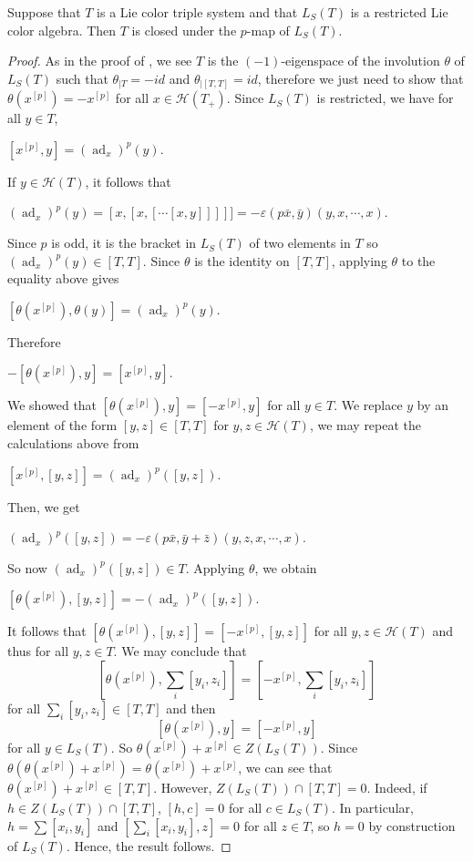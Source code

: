 \documentclass[11pt, twoside]{article}
\DeclareMathOperator{\ad}{ad}
\begin{document}
\begin{thm}\label{thm4.10}
    Suppose that $T$ is a Lie color triple system and that $L_S(T)$ is a restricted Lie color algebra. Then $T$ is closed under the $p$-map of $L_S(T)$.
\end{thm}

\begin{proof}
    As in the proof of \cite[Theorem $3.17 $ ]{H01}, we see $T$ is the $(-1)$-eigenspace of the involution $\theta$ of $L_S(T)$ such that $\theta_{\mid T}=-id $ and $\theta_{\mid [T,T]}=id $, therefore we just need to show that $\theta(x^{[p]})=-x^{[p]} $ for all $x\in \mathcal{H}(T_+)$. Since $L_S(T)$ is restricted, we have for all $y\in T$, \begin{center}
        $[x^{[p]},y]= (\ad_x)^p(y) $.
    \end{center} If $y\in \mathcal{H}(T) $, it follows that \begin{center}
        $(\ad_x)^p(y)= [x,[x,[\cdots[x,y]]]]]= -\varepsilon(p\bar{x},\bar{y})(y,x,\cdots,x) $.
    \end{center} Since $p$ is odd, it is the bracket in $L_S(T)$ of two elements in $T$ so $(\ad_x)^p(y)\in [T,T] $. Since $\theta$ is the identity on $[T,T]$, applying $\theta$ to the equality above gives \begin{center}
        $[\theta(x^{[p]}),\theta(y)]=(\ad_x)^p(y) $.
    \end{center} Therefore \begin{center}
        $-[\theta(x^{[p]}),y]= [x^{[p]},y] $.
    \end{center} We showed that $[\theta(x^{[p]}),y]=[-x^{[p]},y] $ for all $y\in T$. We replace $y$ by an element of the form $[y,z]\in [T,T] $ for $y,z\in \mathcal{H}(T) $, we may repeat the calculations above from \begin{center}
        $[x^{[p]},[y,z]]= (\ad_x)^p([y,z]).$ \end{center} Then,  we get \begin{center}
        $(\ad_x)^p([y,z])= -\varepsilon(p\bar{x},\bar{y}+\bar{z})(y,z,x,\cdots,x) $.
    \end{center} So now $(\ad_x)^p([y,z])\in T $. Applying $\theta$, we obtain \begin{center}
        $[\theta(x^{[p]}),[y,z]]= -(\ad_x)^p([y,z]) $.
    \end{center} It follows that $[\theta(x^{[p]}),[y,z]]=[-x^{[p]},[y,z]] $ for all $y,z\in \mathcal{H}(T) $ and thus for all $y,z\in T $. We may conclude that $$[\theta(x^{[p]}),\sum_i[y_i,z_i]]=[-x^{[p]},\sum_i[y_i,z_i]] $$ for all $\sum_i[y_i,z_i] \in [T,T] $ and then  $$[\theta(x^{[p]}),y]=[-x^{[p]},y] $$ for all $y\in L_S(T)$. So $\theta(x^{[p]})+ x^{[p]}\in Z(L_S(T)) $. Since $\theta(\theta(x^{[p]})+x^{[p]})= \theta(x^{[p]})+x^{[p]} $, we can see that $\theta(x^{[p]})+x^{[p]}\in [T,T] $. However, $Z(L_S(T))\cap [T,T]=0 $. Indeed, if $h\in Z(L_S(T))\cap [T,T]$, $[h,c]=0 $ for all $c\in L_S(T)$. In particular, $h= \sum[x_i,y_i]$ and $[\sum_i[x_i,y_i],z]=0 $ for all $z\in T$, so $h=0$ by construction of $L_S(T)$. Hence, the result follows.
\end{proof}
\end{document}
